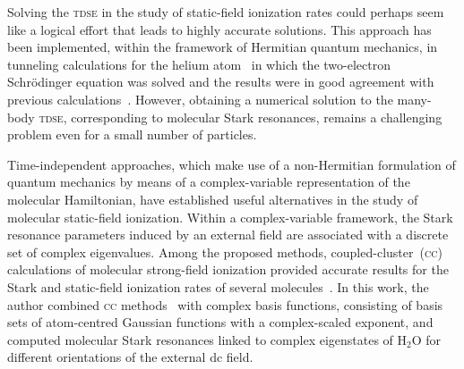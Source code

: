 
Solving the \textsc{tdse} in the study of static-field ionization
rates could perhaps seem like a logical effort that leads to highly
accurate solutions. This approach has been implemented, within the
framework of Hermitian quantum mechanics, in tunneling calculations
for the helium atom~\cite{static_tdse_He,static_tdse_He_method} in
which the two-electron Schr\"{o}dinger equation was solved and the
results were in good agreement with previous
calculations~\cite{static_He_scrinzi}. However, obtaining a numerical
solution to the many-body \textsc{tdse}, corresponding to molecular
Stark resonances, remains a challenging problem even for a small
number of particles.


Time-independent approaches, which make use of a non-Hermitian
formulation of quantum mechanics by means of a complex-variable
representation of the molecular Hamiltonian, have established useful
alternatives in the study of molecular static-field ionization. Within
a complex-variable framework, the Stark resonance parameters induced
by an external field are associated with a discrete set of complex
eigenvalues. Among the proposed methods, coupled-cluster~(\textsc{cc})
calculations of molecular strong-field ionization provided accurate
results for the Stark and static-field ionization rates of several
molecules~\cite{Jagau_manybody_H2O}. In this work, the author combined
\textsc{cc} methods~\cite{cc_method} with complex basis functions,
consisting of basis sets of atom-centred Gaussian functions with a
complex-scaled exponent, and computed molecular Stark resonances
linked to complex eigenstates of H$_{2}$O for different orientations
of the external dc field.



